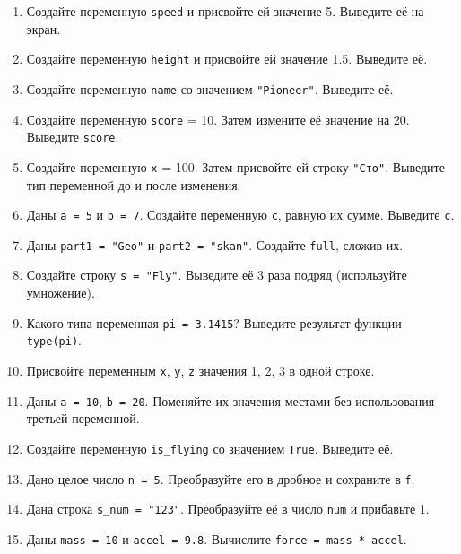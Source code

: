 \begin{enumerate}
    \item Создайте переменную \texttt{speed} и присвойте ей значение 5. Выведите её на экран.
    \item Создайте переменную \texttt{height} и присвойте ей значение 1.5. Выведите её.
    \item Создайте переменную \texttt{name} со значением \texttt{"Pioneer"}. Выведите её.
    \item Создайте переменную \texttt{score} = 10. Затем измените её значение на 20. Выведите \texttt{score}.
    \item Создайте переменную \texttt{x} = 100. Затем присвойте ей строку \texttt{"Сто"}. Выведите тип переменной до и после изменения.
    \item Даны \texttt{a = 5} и \texttt{b = 7}. Создайте переменную \texttt{c}, равную их сумме. Выведите \texttt{c}.
    \item Даны \texttt{part1 = "Geo"} и \texttt{part2 = "skan"}. Создайте \texttt{full}, сложив их.
    \item Создайте строку \texttt{s = "Fly"}. Выведите её 3 раза подряд (используйте умножение).
    \item Какого типа переменная \texttt{pi = 3.1415}? Выведите результат функции \texttt{type(pi)}.
    \item Присвойте переменным \texttt{x}, \texttt{y}, \texttt{z} значения 1, 2, 3 в одной строке.
    \item Даны \texttt{a = 10}, \texttt{b = 20}. Поменяйте их значения местами без использования третьей переменной.
    \item Создайте переменную \texttt{is\_flying} со значением \texttt{True}. Выведите её.
    \item Дано целое число \texttt{n = 5}. Преобразуйте его в дробное и сохраните в \texttt{f}.
    \item Дана строка \texttt{s\_num = "123"}. Преобразуйте её в число \texttt{num} и прибавьте 1.
    \item Даны \texttt{mass = 10} и \texttt{accel = 9.8}. Вычислите \texttt{force = mass * accel}.
\end{enumerate}
